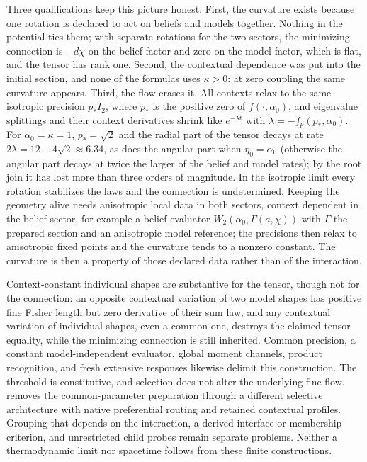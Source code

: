 Three qualifications keep this picture honest. First, the curvature exists because one rotation is declared to act on beliefs and models together. Nothing in the potential ties them; with separate rotations for the two sectors, the minimizing connection is $-d\chi$ on the belief factor and zero on the model factor, which is flat, and the tensor has rank one. Second, the contextual dependence was put into the initial section, and none of the formulas uses $\kappa>0$: at zero coupling the same curvature appears. Third, the flow erases it. All contexts relax to the same isotropic precision $p_*I_2$, where $p_*$ is the positive zero of $f(\cdot,\alpha_0)$, and eigenvalue splittings and their context derivatives shrink like $e^{-\lambda t}$ with $\lambda=-f_p(p_*,\alpha_0)$. For $\alpha_0=\kappa=1$, $p_*=\sqrt2$ and the radial part of the tensor decays at rate $2\lambda=12-4\sqrt2\approx6.34$, as does the angular part when $\eta_0=\alpha_0$ (otherwise the angular part decays at twice the larger of the belief and model rates); by the root join it has lost more than three orders of magnitude. In the isotropic limit every rotation stabilizes the laws and the connection is undetermined. Keeping the geometry alive needs anisotropic local data in both sectors, context dependent in the belief sector, for example a belief evaluator $W_2(\alpha_0,\Gamma(a,\chi))$ with $\Gamma$ the prepared section and an anisotropic model reference; the precisions then relax to anisotropic fixed points and the curvature tends to a nonzero constant. The curvature is then a property of those declared data rather than of the interaction.

Context-constant individual shapes are substantive for the tensor, though not for the connection: an opposite contextual variation of two model shapes has positive fine Fisher length but zero derivative of their sum law, and any contextual variation of individual shapes, even a common one, destroys the claimed tensor equality, while the minimizing connection is still inherited. Common precision, a constant model-independent evaluator, global moment channels, product recognition, and fresh extensive responses likewise delimit this construction. The threshold is constitutive, and selection does not alter the underlying fine flow.  removes the common-parameter preparation through a different selective architecture with native preferential routing and retained contextual profiles. Grouping that depends on the interaction, a derived interface or membership criterion, and unrestricted child probes remain separate problems. Neither a thermodynamic limit nor spacetime follows from these finite constructions.
